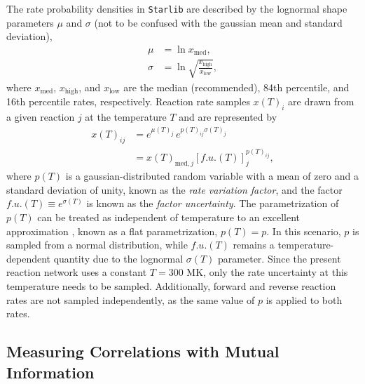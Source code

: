The rate probability densities in \texttt{Starlib} are described by the lognormal shape parameters $\mu$ and $\sigma$ (not to be confused with the gaussian mean and standard deviation),
\begin{align} \label{eqn:lognorm_param}
\mu &= \ln x_{\mathrm{med}}, \nonumber \\
\sigma &= \ln \sqrt{\frac{x_{\mathrm{high}}}{x_{\mathrm{low}}}}, 
\end{align} 
where $x_{\mathrm{med}}$, $x_{\mathrm{high}}$, and $x_{\mathrm{low}}$ are the median (recommended), 84th percentile, and 16th percentile rates, respectively. Reaction rate samples $x(T)_{i}$ are drawn from a given reaction $j$ at the temperature $T$ and are represented by
\begin{align} \label{eqn:MC_Sampling}
x(T)_{ij} &= e^{\mu(T)_{j}} \, e^{p(T)_{ij} \sigma(T)_{j}} \nonumber \\
&= x(T)_{\mathrm{med},j}\left[ f.u.(T) \right]^{p(T)_{ij}}_{j},
\end{align}
where $p(T)$ is a gaussian-distributed random variable with a mean of zero and a standard deviation of unity, known as the \emph{rate variation factor}, and the factor $f.u.(T) \equiv e^{\sigma(T)}$ is known as the \emph{factor uncertainty}. The parametrization of $p(T)$ can be treated as independent of temperature to an excellent approximation \cite{Longland2012}, known as a flat parametrization, $p(T) = p$. In this scenario, $p$ is sampled from a normal distribution, while $f.u.(T)$ remains a temperature-dependent quantity due to the lognormal $\sigma(T)$ parameter. Since the present reaction network uses a constant $T = 300$ MK, only the rate uncertainty at this temperature needs to be sampled. Additionally, forward and reverse reaction rates are not sampled independently, as the same value of $p$ is applied to both rates.

\subsection{Measuring Correlations with Mutual Information}

